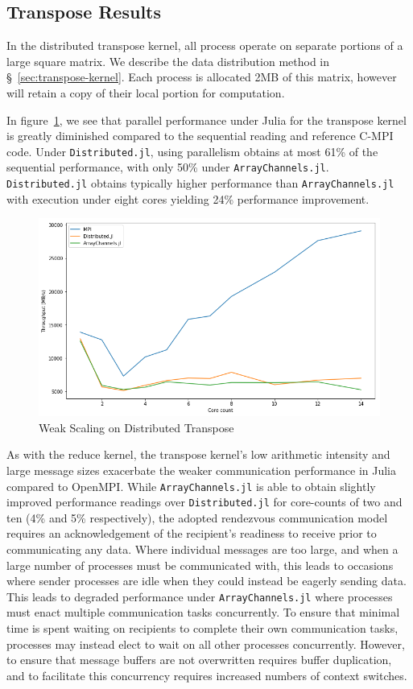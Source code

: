 \subsection{Transpose Results}
\label{sec:transpose-results}

In the distributed transpose kernel, all process operate on separate
portions of a large square matrix. We describe the data distribution
method in \S~\ref{sec:transpose-kernel}. Each process is allocated
2MB of this matrix, however will retain a copy of their local portion
for computation.

In figure~\ref{fig:plot-transpose}, we see that parallel performance
under Julia for the transpose kernel is greatly diminished compared to
the sequential reading and reference C-MPI code. Under
\texttt{Distributed.jl}, using parallelism obtains at most 61\% of the
sequential performance, with only 50\% under \texttt{ArrayChannels.jl}.
\texttt{Distributed.jl} obtains typically higher performance than
\texttt{ArrayChannels.jl} with execution under eight cores yielding 24\%
performance improvement.

\begin{figure}[htb]
  \includegraphics[width=\linewidth]{figs/transpose.png}
  \caption{Weak Scaling on Distributed Transpose}
  \label{fig:plot-transpose}
\end{figure}

As with the reduce kernel, the transpose kernel's low arithmetic
intensity and large message sizes exacerbate the weaker communication
performance in Julia compared to OpenMPI. While
\texttt{ArrayChannels.jl} is able to obtain slightly improved
performance readings over \texttt{Distributed.jl} for core-counts of two
and ten (4\% and 5\% respectively), the adopted rendezvous communication
model requires an acknowledgement of the recipient's readiness to
receive prior to communicating any data. Where individual messages are
too large, and when a large number of processes must be communicated
with, this leads to occasions where sender processes are idle when they
could instead be eagerly sending data. This leads to degraded
performance under \texttt{ArrayChannels.jl} where processes must enact
multiple communication tasks concurrently. To ensure that minimal time
is spent waiting on recipients to complete their own communication
tasks, processes may instead elect to wait on all other processes
concurrently. However, to ensure that message buffers are not
overwritten requires buffer duplication, and to facilitate this
concurrency requires increased numbers of context switches.

